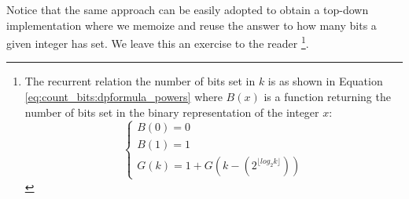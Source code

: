 Notice that the same approach can be easily adopted to obtain a top-down implementation where we memoize and reuse the answer to how many bits a given integer has set.
We leave this an exercise to the reader \footnote{The recurrent relation the number of bits set in $k$ is as shown in Equation \ref{eq:count_bits:dpformula_powers} where $B(x)$ is a function returning the number of bits set in the binary representation of the integer $x$:
\begin{equation}
	\begin{cases}
		B(0) = 0 \\
		B(1) = 1 \\
		G(k) =  1 + G(k-(2^{\lfloor log_2{k \rfloor}})) 	 \end{cases}
	\label{eq:count_bits:dpformula_powers}
\end{equation}
}.